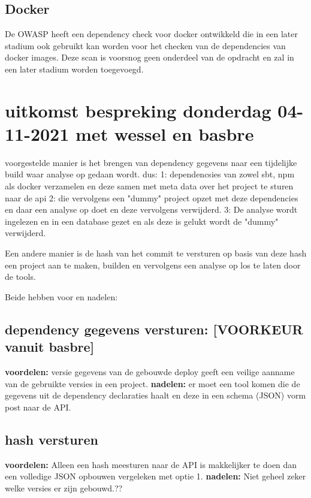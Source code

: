\subsection{Docker}\label{subsec:docker}
De OWASP heeft een dependency check voor docker ontwikkeld die in een later stadium ook gebruikt kan worden voor het checken van de dependencies van docker images. Deze scan is voorsnog geen onderdeel van de opdracht en zal in een later stadium worden toegevoegd.



\section{uitkomst bespreking donderdag 04-11-2021 met wessel en basbre}

voorgestelde manier is het brengen van dependency gegevens naar een tijdelijke build waar analyse op gedaan wordt. dus: 1: dependencsies van zowel sbt, npm als docker verzamelen en deze samen met meta data over het project te sturen naar de api  2: die vervolgens een "dummy" project opzet met deze dependencies en daar een analyse op doet en deze vervolgens verwijderd. 3: De analyse wordt ingelezen en in een database gezet en als deze is gelukt wordt de "dummy" verwijderd.

Een andere manier is de hash van het commit te versturen op basis van deze hash een project aan te maken, builden en vervolgens een analyse op los te laten door de tools.

Beide hebben voor en nadelen:

\subsection{dependency gegevens versturen: [VOORKEUR vanuit basbre]}
\textbf{voordelen:}
versie gegevens van de gebouwde deploy geeft een veilige aanname van de gebruikte versies in een project.
\textbf{nadelen:}
er moet een tool komen die de gegevens uit de dependency declaraties haalt en deze in een schema (JSON) vorm post naar de API.

\subsection{hash versturen}
\textbf{voordelen:}
Alleen een hash meesturen naar de API is makkelijker te doen dan een volledige JSON opbouwen vergeleken met optie 1.
\textbf{nadelen:}
Niet geheel zeker welke versies er zijn gebouwd.??
